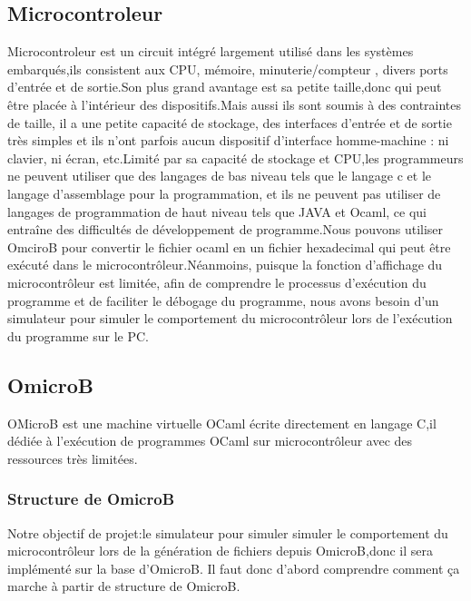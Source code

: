 \documentclass[14px]{article}
\begin{document}
\subsection{Microcontroleur}
Microcontroleur est un circuit intégré largement utilisé dans les systèmes embarqués,ils consistent aux CPU, mémoire, minuterie/compteur , divers ports d'entrée et de sortie.Son plus grand avantage est sa petite taille,donc qui peut être placée à l'intérieur des dispositifs.Mais aussi ils sont soumis à des contraintes de taille, il a une petite capacité de stockage, des interfaces d'entrée et de sortie très simples et ils n'ont parfois aucun dispositif d'interface homme-machine : ni clavier, ni écran, etc.Limité par sa capacité de stockage et CPU,les programmeurs ne peuvent utiliser que des langages de bas niveau tels que le langage c et le langage d'assemblage pour la programmation, et ils ne peuvent pas utiliser de langages de programmation de haut niveau tels que JAVA et Ocaml, ce qui entraîne des difficultés de développement de programme.Nous pouvons utiliser OmciroB pour convertir le fichier ocaml en un fichier hexadecimal qui peut être exécuté dans le microcontrôleur.Néanmoins,
 puisque la fonction d'affichage du microcontrôleur est limitée, afin de comprendre le processus d'exécution du programme et de faciliter le débogage du programme, nous avons besoin d'un simulateur pour simuler le comportement du microcontrôleur lors de l'exécution du programme sur le PC.
\subsection{OmicroB}
OMicroB est une machine virtuelle OCaml écrite directement en langage C,il dédiée à l'exécution de programmes OCaml sur microcontrôleur avec des ressources très limitées.\\

\subsubsection{Structure de OmicroB}
Notre objectif de projet:le simulateur pour simuler simuler le comportement du microcontrôleur lors de la génération de fichiers depuis OmicroB,donc il sera implémenté sur la base d'OmicroB. Il faut donc d'abord comprendre comment ça marche à partir de structure de OmicroB.\\
\end{document}
